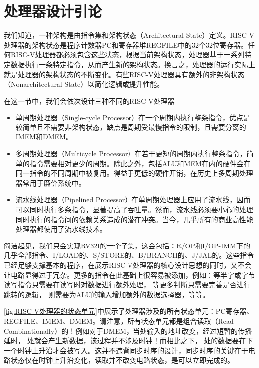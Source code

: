 \section{处理器设计引论}
我们知道，一种架构是由指令集和架构状态（Architectural State）定义。RISC-V处理器的架构状态是程序计数器PC和寄存器堆REGFILE中的$32$个$32$位寄存器。任何RISC-V处理器都必须包含这些状态，根据当前架构状态，处理器基于一系列特定数据执行一条特定指令，从而产生新的架构状态。换言之，处理器的运行实际上就是处理器的架构状态的不断变化。有些RISC-V处理器具有额外的非架构状态（Nonarchitectural State）以简化逻辑或提升性能。

在这一节中，我们会依次设计三种不同的RISC-V处理器
\begin{itemize}
    \item 单周期处理器（Single-cycle Processor）在一个周期内执行整条指令，优点是较简单且不需要非架构状态，缺点是周期受最慢指令的限制，且需要分离的IMEM和DMEM。
    \item 多周期处理器（Multicycle Processor）在若干更短的周期内执行整条指令，简单的指令需要相对更少的周期。除此之外，包括ALU和MEM在内的硬件会在同一指令的不同周期中被复用。得益于更低的硬件开销，在历史上多周期处理器常用于廉价系统中。
    \item 流水线处理器（Pipelined Processor）在单周期处理器上应用了流水线，因而可以同时执行多条指令，显著提高了吞吐量。然而，流水线必须要小心的处理同时执行的指令间的依赖关系造成的潜在冲突。当今，几乎所有的商业高性能处理器都使用了流水线技术。
\end{itemize}
简洁起见，我们只会实现RV32I的一个子集，这会包括：R/OP和I/OP-IMM下的几乎全部指令、I/LOAD的、S/STORE的、B/BRANCH的、J/JAL的。这些指令已经足够支撑基本的程序，在展示RISC-V处理器的核心设计思想的同时，又不会让电路显得过于冗杂。更多的指令在此基础上很容易被添加，例如：等半字或字节读写指令只需要在读写时对数据进行额外处理， 等更多判断只需要完善是否进行跳转的逻辑， 则需要为ALU的输入增加额外的数据选择器，等等。

\cref{fig:RISC-V处理器的状态单元}中展示了处理器涉及的所有状态单元：PC寄存器、REGFILE、IMEM、DMEM。请注意，所有状态单元都是组合读取（Read Combinationally）的！例如对于DMEM，当处输入的地址改变，经过短暂的传播延时， 处就会产生新数据，该过程并不涉及时钟！而相比之下， 处的数据要在下一个时钟上升沿才会被写入。这并不违背同步时序的设计，同步时序的关键在于电路状态仅在时钟上升沿变化，读取并不改变电路状态，是可以立即完成的。
\begin{Figure}
    \hspace{0.5cm}
    \hspace{0.5cm}
    \hspace{0.5cm}
\end{Figure}

